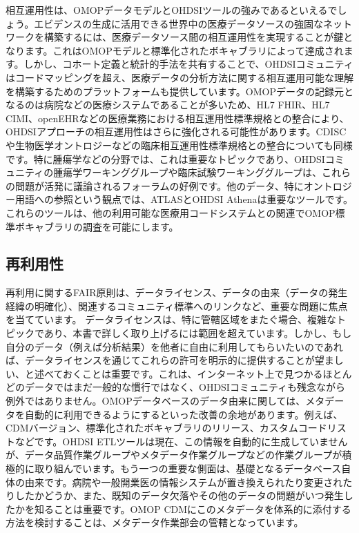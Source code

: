 \documentclass[
  11pt]{book}
\theoremstyle{definition}
\theoremstyle{definition}
\theoremstyle{definition}
\theoremstyle{definition}
\theoremstyle{remark}
\begin{document}
相互運用性は、OMOPデータモデルとOHDSIツールの強みであるといえるでしょう。エビデンスの生成に活用できる世界中の医療データソースの強固なネットワークを構築するには、医療データソース間の相互運用性を実現することが鍵となります。これはOMOPモデルと標準化されたボキャブラリによって達成されます。しかし、コホート定義と統計的手法を共有することで、OHDSIコミュニティはコードマッピングを超え、医療データの分析方法に関する相互運用可能な理解を構築するためのプラットフォームも提供しています。OMOPデータの記録元となるのは病院などの医療システムであることが多いため、HL7 FHIR、HL7 CIMI、openEHRなどの医療業務における相互運用性標準規格との整合により、OHDSIアプローチの相互運用性はさらに強化される可能性があります。CDISCや生物医学オントロジーなどの臨床相互運用性標準規格との整合についても同様です。特に腫瘍学などの分野では、これは重要なトピックであり、OHDSIコミュニティの腫瘍学ワーキンググループや臨床試験ワーキンググループは、これらの問題が活発に議論されるフォーラムの好例です。他のデータ、特にオントロジー用語への参照という観点では、ATLASとOHDSI Athenaは重要なツールです。これらのツールは、他の利用可能な医療用コードシステムとの関連でOMOP標準ボキャブラリの調査を可能にします。

\subsection{再利用性}\label{ux518dux5229ux7528ux6027}

再利用に関するFAIR原則は、データライセンス、データの由来（データの発生経緯の明確化）、関連するコミュニティ標準へのリンクなど、重要な問題に焦点を当てています。 データライセンスは、特に管轄区域をまたぐ場合、複雑なトピックであり、本書で詳しく取り上げるには範囲を超えています。しかし、もし自分のデータ（例えば分析結果）を他者に自由に利用してもらいたいのであれば、データライセンスを通じてこれらの許可を明示的に提供することが望ましい、と述べておくことは重要です。これは、インターネット上で見つかるほとんどのデータではまだ一般的な慣行ではなく、OHDSIコミュニティも残念ながら例外ではありません。OMOPデータベースのデータ由来に関しては、メタデータを自動的に利用できるようにするといった改善の余地があります。例えば、CDMバージョン、標準化されたボキャブラリのリリース、カスタムコードリストなどです。OHDSI ETLツールは現在、この情報を自動的に生成していませんが、データ品質作業グループやメタデータ作業グループなどの作業グループが積極的に取り組んでいます。もう一つの重要な側面は、基礎となるデータベース自体の由来です。病院や一般開業医の情報システムが置き換えられたり変更されたりしたかどうか、また、既知のデータ欠落やその他のデータの問題がいつ発生したかを知ることは重要です。OMOP CDMにこのメタデータを体系的に添付する方法を検討することは、メタデータ作業部会の管轄となっています。
\end{document}
